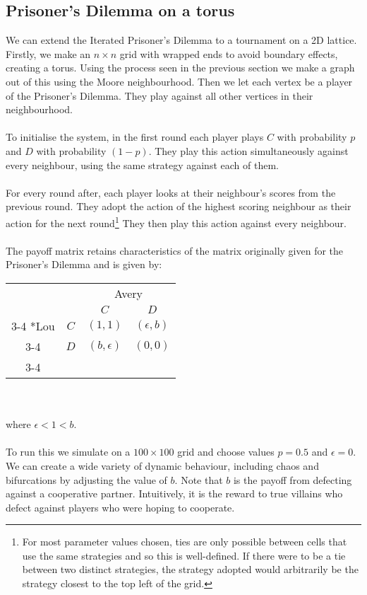 \subsection{Prisoner's Dilemma on a torus}\label{p-d-torus}
We can extend the Iterated Prisoner's Dilemma to a tournament on a 2D lattice. Firstly, we make an $n \times n$ grid with wrapped ends to avoid boundary effects, creating a torus. Using the process seen in the previous section we make a graph out of this using the Moore neighbourhood. Then we let each vertex be a player of the Prisoner's Dilemma. They play against all other vertices in their neighbourhood\cite{eq_of_life}.\\
\\
To initialise the system, in the first round each player plays $C$ with probability $p$ and $D$ with probability $(1-p)$. They play this action simultaneously against every neighbour, using the same strategy against each of them.\\
\\
For every round after, each player looks at their neighbour's scores from the previous round. They adopt the action of the highest scoring neighbour as their action for the next round\footnote{For most parameter values chosen, ties are only possible between cells that use the same strategies and so this is well-defined. If there were to be a tie between two distinct strategies, the strategy adopted would arbitrarily be the strategy closest to the top left of the grid.}\label{mmd} They then play this action against every neighbour.\\
\\
The payoff matrix retains characteristics of the matrix originally given for the Prisoner's Dilemma and is given by:\\
\setlength{\extrarowheight}{2pt}
\begin{tabular}{cc|c|c|}
	& \multicolumn{1}{c}{} & \multicolumn{2}{c}{Avery}\\
	& \multicolumn{1}{c}{} & \multicolumn{1}{c}{$C$}  & \multicolumn{1}{c}{$D$} \\\cline{3-4}
	\multirow{2}*{Lou}  & $C$ & $(1,1)$ & $(\epsilon,b)$ \\\cline{3-4}
	& $D$ & $(b,\epsilon)$ & $(0,0)$ \\\cline{3-4}
\end{tabular}
\\
\\
where $\epsilon<1<b$.\\
\\
To run this we simulate on a $100\times100$ grid and choose values $p=0.5$ and $\epsilon=0$. We can create a wide variety of dynamic behaviour, including chaos and bifurcations by adjusting the value of $b$. Note that $b$ is the payoff from defecting against a cooperative partner. Intuitively, it is the reward to true villains who defect against players who were hoping to cooperate.
